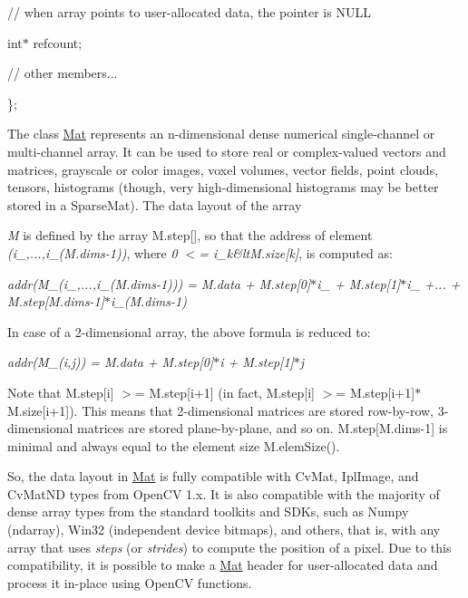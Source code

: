 {\ttfamily // when array points to user-\/allocated data, the pointer is N\+U\+LL}

{\ttfamily }

{\ttfamily }

{\ttfamily int$\ast$ refcount;}

{\ttfamily }

{\ttfamily }

{\ttfamily // other members...}

{\ttfamily }

{\ttfamily }

{\ttfamily \};}

{\ttfamily }

{\ttfamily }

{\ttfamily The class {\ttfamily \mbox{\hyperlink{classorg_1_1opencv_1_1core_1_1_mat}{Mat}}} represents an n-\/dimensional dense numerical single-\/channel or multi-\/channel array. It can be used to store real or complex-\/valued vectors and matrices, grayscale or color images, voxel volumes, vector fields, point clouds, tensors, histograms (though, very high-\/dimensional histograms may be better stored in a {\ttfamily Sparse\+Mat}). The data layout of the array }

{\itshape M} is defined by the array {\ttfamily M.\+step\mbox{[}\mbox{]}}, so that the address of element {\itshape (i\+\_,...,i\+\_\+(M.\+dims-\/1))}, where {\itshape 0 $<$= i\+\_\+k\&lt\+M.\+size\mbox{[}k\mbox{]}}, is computed as\+:

{\itshape addr(M\+\_\+(i\+\_,...,i\+\_\+(M.\+dims-\/1))) = M.\+data + M.\+step\mbox{[}0\mbox{]}$\ast$i\+\_ + M.\+step\mbox{[}1\mbox{]}$\ast$i\+\_ +... + M.\+step\mbox{[}M.\+dims-\/1\mbox{]}$\ast$i\+\_\+(M.\+dims-\/1)}

In case of a 2-\/dimensional array, the above formula is reduced to\+:

{\itshape addr(\+M\+\_\+(i,j)) = M.\+data + M.\+step\mbox{[}0\mbox{]}$\ast$i + M.\+step\mbox{[}1\mbox{]}$\ast$j}

Note that {\ttfamily M.\+step\mbox{[}i\mbox{]} $>$= M.\+step\mbox{[}i+1\mbox{]}} (in fact, {\ttfamily M.\+step\mbox{[}i\mbox{]} $>$= M.\+step\mbox{[}i+1\mbox{]}$\ast$M.size\mbox{[}i+1\mbox{]}}). This means that 2-\/dimensional matrices are stored row-\/by-\/row, 3-\/dimensional matrices are stored plane-\/by-\/plane, and so on. {\ttfamily M.\+step\mbox{[}M.\+dims-\/1\mbox{]}} is minimal and always equal to the element size {\ttfamily M.\+elem\+Size()}.

So, the data layout in {\ttfamily \mbox{\hyperlink{classorg_1_1opencv_1_1core_1_1_mat}{Mat}}} is fully compatible with {\ttfamily Cv\+Mat}, {\ttfamily Ipl\+Image}, and {\ttfamily Cv\+Mat\+ND} types from Open\+CV 1.\+x. It is also compatible with the majority of dense array types from the standard toolkits and S\+D\+Ks, such as Numpy (ndarray), Win32 (independent device bitmaps), and others, that is, with any array that uses {\itshape steps} (or {\itshape strides}) to compute the position of a pixel. Due to this compatibility, it is possible to make a {\ttfamily \mbox{\hyperlink{classorg_1_1opencv_1_1core_1_1_mat}{Mat}}} header for user-\/allocated data and process it in-\/place using Open\+CV functions.

